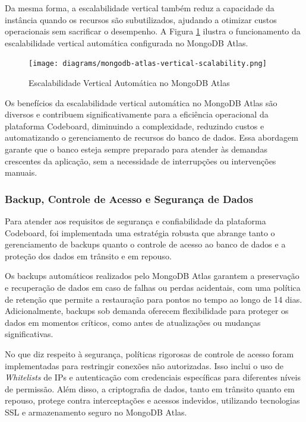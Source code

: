 Da mesma forma, a escalabilidade vertical também reduz a capacidade da instância quando os recursos são subutilizados, ajudando a otimizar custos operacionais sem sacrificar o desempenho. A Figura \ref{fig:mongodb-atlas-vertical-scalability} ilustra o funcionamento da escalabilidade vertical automática configurada no MongoDB Atlas.

\begin{figure}[H]
    \centering
    \texttt{[image: diagrams/mongodb-atlas-vertical-scalability.png]}
    \caption{Escalabilidade Vertical Automática no MongoDB Atlas}
    \label{fig:mongodb-atlas-vertical-scalability}
\end{figure} 

Os benefícios da escalabilidade vertical automática no MongoDB Atlas são diversos e contribuem significativamente para a eficiência operacional da plataforma Codeboard, diminuindo a complexidade, reduzindo custos e automatizando o gerenciamento de recursos do banco de dados. Essa abordagem garante que o banco esteja sempre preparado para atender às demandas crescentes da aplicação, sem a necessidade de interrupções ou intervenções manuais.


\subsubsection{Backup, Controle de Acesso e Segurança de Dados}

Para atender aos requisitos de segurança e confiabilidade da plataforma Codeboard, foi implementada uma estratégia robusta que abrange tanto o gerenciamento de backups quanto o controle de acesso ao banco de dados e a proteção dos dados em trânsito e em repouso.

Os backups automáticos realizados pelo MongoDB Atlas garantem a preservação e recuperação de dados em caso de falhas ou perdas acidentais, com uma política de retenção que permite a restauração para pontos no tempo ao longo de 14 dias. Adicionalmente, backups sob demanda oferecem flexibilidade para proteger os dados em momentos críticos, como antes de atualizações ou mudanças significativas.

No que diz respeito à segurança, políticas rigorosas de controle de acesso foram implementadas para restringir conexões não autorizadas. Isso inclui o uso de \emph{Whitelists} de IPs e autenticação com credenciais específicas para diferentes níveis de permissão. Além disso, a criptografia de dados, tanto em trânsito quanto em repouso, protege contra interceptações e acessos indevidos, utilizando tecnologias SSL e armazenamento seguro no MongoDB Atlas.

